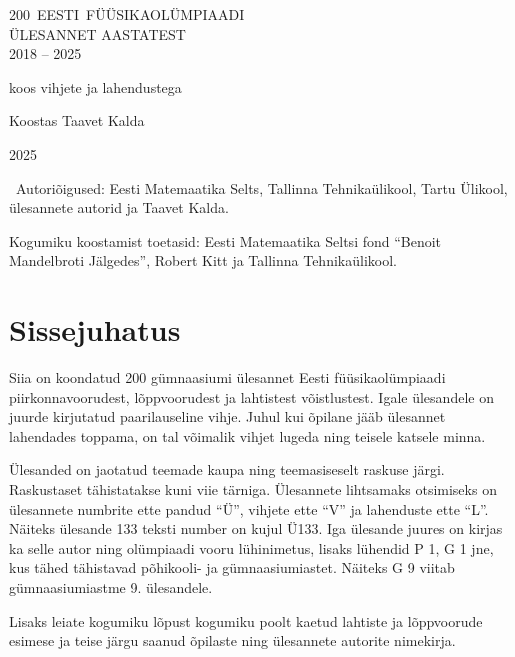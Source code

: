 \documentclass[10pt]{article}
\begin{document}
\begin{titlepage}
    \centering
    \vspace{10cm}
    {\sffamily\Huge \mbox{200 EESTI FÜÜSIKAOLÜMPIAADI}\\ ÜLESANNET AASTATEST\\ 2018 -- 2025\par}
    \vspace{1cm}
    {\Large koos vihjete ja lahendustega\par}
    \vfill
    {\Large Koostas Taavet Kalda}

    \vfill

    {\large 2025}
\end{titlepage}

\raggedbottom %
\mbox{}\vfill

\textcopyright~Autoriõigused: Eesti Matemaatika Selts, Tallinna Tehnikaülikool,
Tartu Ülikool, ülesannete autorid ja Taavet Kalda.
\vspace{0.5\baselineskip}

Kogumiku koostamist toetasid: Eesti Matemaatika Seltsi fond ``Benoit Mandelbroti Jälgedes'', Robert Kitt ja Tallinna Tehnikaülikool.
\vspace{0.5\baselineskip}

\newpage

\tableofcontents
\newpage

{\setlength{\parindent}{24pt}
\section{Sissejuhatus}

Siia on koondatud 200 gümnaasiumi ülesannet Eesti füüsikaolümpiaadi piirkonnavoorudest, lõppvoorudest ja lahtistest võistlustest. Igale ülesandele on juurde kirjutatud paarilauseline vihje. Juhul kui õpilane jääb ülesannet lahendades toppama, on tal võimalik vihjet lugeda ning teisele katsele minna.


Ülesanded on jaotatud teemade kaupa ning teemasiseselt raskuse järgi. Raskustaset tähistatakse kuni viie tärniga. Ülesannete lihtsamaks otsimiseks on ülesannete numbrite ette pandud \enquote{Ü}, vihjete ette \enquote{V} ja lahenduste ette \enquote{L}. Näiteks ülesande 133 teksti number on kujul Ü133. Iga ülesande juures on kirjas ka selle autor ning olümpiaadi vooru lühinimetus, lisaks lühendid P 1, G 1 jne, kus tähed tähistavad põhikooli- ja gümnaasiumiastet. Näiteks G 9 viitab gümnaasiumiastme 9. ülesandele.


Lisaks leiate kogumiku lõpust kogumiku poolt kaetud lahtiste ja lõppvoorude esimese ja teise järgu saanud õpilaste ning ülesannete autorite nimekirja.}
\newpage
\setlength{\parindent}{0pt}
\end{document}
